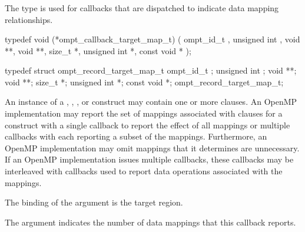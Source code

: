 \subsubsection{}
\label{sec:ompt_callback_target_map_t}
\summary
The  type is used for callbacks that are
dispatched to indicate data mapping relationships.

\format
\begin{ccppspecific}
\begin{omptCallback}
typedef void (*ompt_callback_target_map_t) (
  ompt_id_t ,
  unsigned int ,
  void **,
  void **,
  size_t *,
  unsigned int *,
  const void *
);
\end{omptCallback}
\end{ccppspecific}

\record
\begin{ccppspecific}
\begin{omptRecord}
typedef struct ompt_record_target_map_t {
  ompt_id_t ;
  unsigned int ;
  void **;
  void **;
  size_t *;
  unsigned int *;
  const void *;
} ompt_record_target_map_t;
\end{omptRecord}
\end{ccppspecific}

\descr
An instance of a , , , or 
 construct may contain one or more  clauses.
An OpenMP implementation may report the set of mappings associated with  
clauses for a construct with a single  callback to 
report the effect of all mappings or multiple  
callbacks with each reporting a subset of the mappings. Furthermore, an OpenMP 
implementation may omit mappings that it determines are unnecessary. If an OpenMP 
implementation issues multiple  callbacks, these 
callbacks may be interleaved with  callbacks
used to report data operations associated with the mappings.

\argdesc
The binding of the  argument is the target region.

The  argument indicates the number of data mappings that 
this callback reports.

